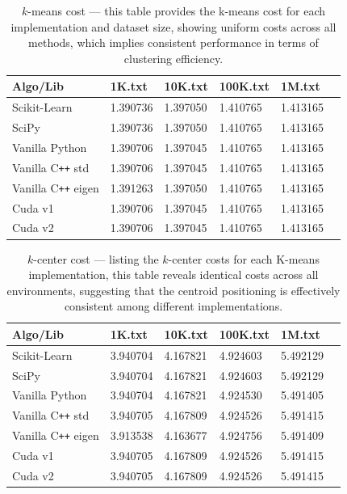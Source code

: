 \documentclass{article}
\begin{document}
  \begin{table}[H]
    \centering
    \begin{tabular}{|P{4cm}|P{2.5cm}|P{2.5cm}|P{2.5cm}|P{2.5cm}|P{2.5cm}|}
      \hline
      {\sf Algo/Lib} & {\sf 1K.txt} & {\sf 10K.txt} & {\sf 100K.txt} & {\sf 1M.txt} \\ \hline
      {\sc Scikit-Learn} & 1.390736 & 1.397050 & 1.410765 & 1.413165 \\
      {\sc SciPy} & 1.390736 & 1.397050 & 1.410765 & 1.413165 \\
      {\sc Vanilla Python} & 1.390706 & 1.397045 & 1.410765 & 1.413165 \\
      {\sc Vanilla C{\tt++} std} & 1.390706 & 1.397045 & 1.410765 & 1.413165 \\
      {\sc Vanilla C{\tt++} eigen} & 1.391263 & 1.397050 & 1.410765 & 1.413165 \\
      {\sc Cuda v1} & 1.390706 & 1.397045 & 1.410765 & 1.413165 \\
      {\sc Cuda v2} & 1.390706 & 1.397045 & 1.410765 & 1.413165 \\ \hline
    \end{tabular}
    \caption{
      $k$-means cost --- this table provides the k-means cost for each implementation
      and dataset size, showing uniform costs across all methods, which implies
      consistent performance in terms of clustering efficiency.
    }
    \label{tbl:kmeans-cost}
  \end{table}

  \begin{table}[H]
    \centering
    \begin{tabular}{|P{4cm}|P{2.5cm}|P{2.5cm}|P{2.5cm}|P{2.5cm}|P{2.5cm}|}
      \hline
      {\sf Algo/Lib} & {\sf 1K.txt} & {\sf 10K.txt} & {\sf 100K.txt} & {\sf 1M.txt} \\ \hline
      {\sc Scikit-Learn} & 3.940704 & 4.167821 & 4.924603 & 5.492129 \\
      {\sc SciPy} & 3.940704 & 4.167821 & 4.924603 & 5.492129 \\
      {\sc Vanilla Python} & 3.940704 & 4.167821 & 4.924530 & 5.491405 \\
      {\sc Vanilla C{\tt++} std} & 3.940705 & 4.167809 & 4.924526 & 5.491415 \\
      {\sc Vanilla C{\tt++} eigen} & 3.913538 & 4.163677 & 4.924756 & 5.491409 \\
      {\sc Cuda v1} & 3.940705 & 4.167809 & 4.924526 & 5.491415 \\
      {\sc Cuda v2} & 3.940705 & 4.167809 & 4.924526 & 5.491415 \\ \hline
    \end{tabular}
    \caption{
      $k$-center cost --- listing the $k$-center costs for each {\sc K-means}
      implementation, this table reveals identical costs across all environments,
      suggesting that the centroid positioning is effectively consistent among
      different implementations.
    }
    \label{tbl:kcenter-cost}
  \end{table}
\end{document}
